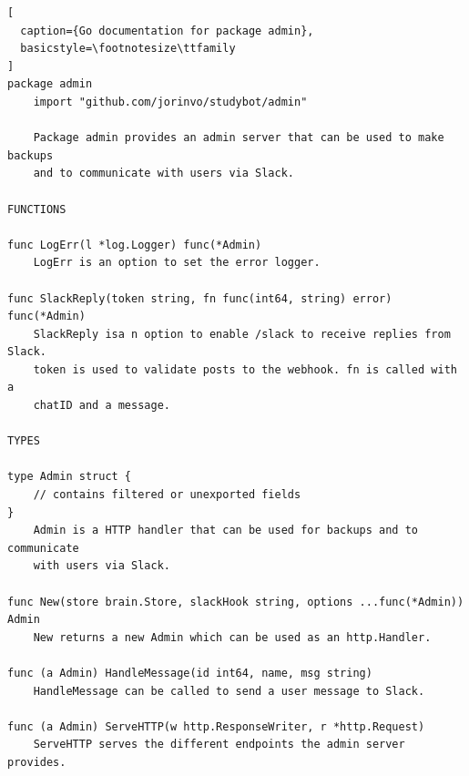 \pagebreak
\begin{lstlisting}[
  caption={Go documentation for package admin},
  basicstyle=\footnotesize\ttfamily
]
package admin
    import "github.com/jorinvo/studybot/admin"

    Package admin provides an admin server that can be used to make backups
    and to communicate with users via Slack.

FUNCTIONS

func LogErr(l *log.Logger) func(*Admin)
    LogErr is an option to set the error logger.

func SlackReply(token string, fn func(int64, string) error) func(*Admin)
    SlackReply isa n option to enable /slack to receive replies from Slack.
    token is used to validate posts to the webhook. fn is called with a
    chatID and a message.

TYPES

type Admin struct {
    // contains filtered or unexported fields
}
    Admin is a HTTP handler that can be used for backups and to communicate
    with users via Slack.

func New(store brain.Store, slackHook string, options ...func(*Admin)) Admin
    New returns a new Admin which can be used as an http.Handler.

func (a Admin) HandleMessage(id int64, name, msg string)
    HandleMessage can be called to send a user message to Slack.

func (a Admin) ServeHTTP(w http.ResponseWriter, r *http.Request)
    ServeHTTP serves the different endpoints the admin server provides.
\end{lstlisting}


